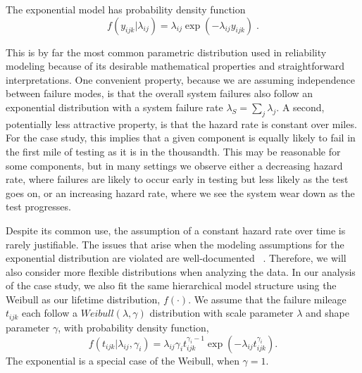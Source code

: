 \documentclass[12pt]{article}
\begin{document}
The exponential model has probability density function
\begin{equation*}
    f(y_{ijk}|\lambda_{ij})=\lambda_{ij} \exp(-\lambda_{ij}y_{ijk}) \;.
\end{equation*}

This is by far the most common parametric distribution used in reliability
modeling because of its desirable mathematical properties and straightforward interpretations.  One convenient property, because we are assuming
independence between failure modes, is that the overall system failures also follow
an exponential distribution with a system failure rate $\lambda_S =
\sum_{j}\lambda_{j}$.  A second, potentially less attractive property, is that the hazard rate is constant over miles.  For the case study, this implies that a given
component is equally likely to fail in the first mile of testing as it is in the thousandth.  This may be reasonable for some components, but in many settings we observe either a decreasing hazard rate, where failures are likely to
occur early in testing but less likely as the test goes on, or an increasing hazard rate, where we see the system wear down as the test progresses.

Despite its common use, the assumption of a constant hazard rate over time is rarely justifiable. The issues that arise when the modeling assumptions for the exponential distribution are violated are well-documented ~\cite{ref3}. Therefore, we will also consider more flexible distributions when analyzing the data.  In our analysis of the case study, we also fit the same hierarchical model structure using the Weibull as our
lifetime distribution, $f(\cdot)$. We assume that the failure mileage $t_{ijk}$ each follow a $Weibull(\lambda, \gamma)$ distribution with scale
parameter $\lambda$ and shape parameter $\gamma$, with probability density
function,
\begin{equation*}
    f(t_{ijk}|\lambda_{ij},\gamma_{i})=\lambda_{ij}\gamma_{i}
    t_{ijk}^{\gamma_{i}-1}\exp(-\lambda_{ij} t_{ijk}^{\gamma_{i}}).
\end{equation*}
The exponential is a special case of the Weibull, when $\gamma = 1$.
\end{document}
